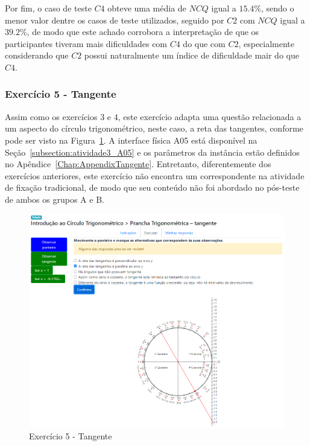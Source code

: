 Por fim, o caso de teste $C4$ obteve uma média de $NCQ$ igual a $15.4\%$, sendo o menor valor dentre os casos de teste utilizados, seguido por $C2$ com $NCQ$ igual a $39.2\%$, de modo que este achado corrobora a interpretação de que os participantes tiveram mais dificuldades com $C4$ do que com $C2$, especialmente considerando que $C2$ possui naturalmente um índice de dificuldade mair do que $C4$.

\subsubsection{Exercício 5 - Tangente}\label{subsubsec:F3A5}

Assim como os exercícios 3 e 4, este exercício adapta uma questão relacionada a um aspecto do círculo trigonométrico, neste caso, a reta das tangentes, conforme pode ser visto na Figura~\ref{fig:E5}. A interface física A05 está disponível na Seção~\ref{subsection:atividade3_A05} e os parâmetros da instância estão definidos no Apêndice~\ref{Chap:AppendixTangente}. Entretanto, diferentemente dos exercícios anteriores, este exercício não encontra um correspondente na atividade de fixação tradicional, de modo que seu conteúdo não foi abordado no pós-teste de ambos os grupos A e B.

\begin{figure}[htb]
	\centering
	\includegraphics[width=0.95\linewidth]{chapters/results/Fase 3/E5_Virtual.png}
	\caption{Exercício 5 - Tangente}
	\label{fig:E5}
\end{figure}

